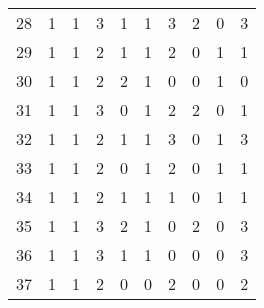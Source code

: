 \begin{longtable}{cp{1.5cm}p{1.5cm}p{1.5cm}p{1.5cm}p{1.5cm}p{1.5cm}p{1.5cm}p{1.5cm}p{1.5cm}}
28 &                      1 &                      1 &                      3 &                         1 &                         1 &                         3 &                      2 &                      0 &                      3 \\
29 &                      1 &                      1 &                      2 &                         1 &                         1 &                         2 &                      0 &                      1 &                      1 \\
30 &                      1 &                      1 &                      2 &                         2 &                         1 &                         0 &                      0 &                      1 &                      0 \\
31 &                      1 &                      1 &                      3 &                         0 &                         1 &                         2 &                      2 &                      0 &                      1 \\
32 &                      1 &                      1 &                      2 &                         1 &                         1 &                         3 &                      0 &                      1 &                      3 \\
33 &                      1 &                      1 &                      2 &                         0 &                         1 &                         2 &                      0 &                      1 &                      1 \\
34 &                      1 &                      1 &                      2 &                         1 &                         1 &                         1 &                      0 &                      1 &                      1 \\
35 &                      1 &                      1 &                      3 &                         2 &                         1 &                         0 &                      2 &                      0 &                      3 \\
36 &                      1 &                      1 &                      3 &                         1 &                         1 &                         0 &                      0 &                      0 &                      3 \\
37 &                      1 &                      1 &                      2 &                         0 &                         0 &                         2 &                      0 &                      0 &                      2 \\

\end{longtable}
